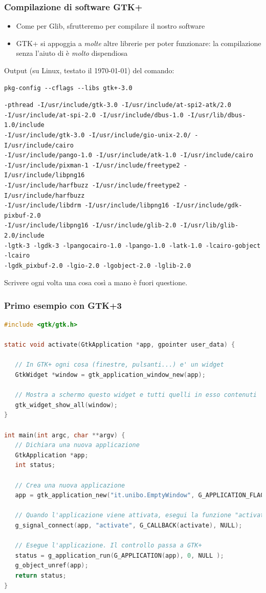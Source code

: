 \documentclass{beamer}
\begin{document}
\begin{frame}[fragile]
\frametitle{Compilazione di software GTK+}
\begin{itemize}
 \item Come per Glib, sfrutteremo \pkgconfig{} per compilare il nostro software
 \item GTK+ si appoggia a \textit{molte} altre librerie per poter funzionare: la compilazione senza l'aiuto di \pkgconfig{} è \textit{molto} dispendiosa
\end{itemize}
Output (su Linux, testato il \today{}) del comando:
\scriptsize
\begin{verbatim}
pkg-config --cflags --libs gtk+-3.0
\end{verbatim}
\scriptsize
\begin{verbatim}
-pthread -I/usr/include/gtk-3.0 -I/usr/include/at-spi2-atk/2.0
-I/usr/include/at-spi-2.0 -I/usr/include/dbus-1.0 -I/usr/lib/dbus-1.0/include
-I/usr/include/gtk-3.0 -I/usr/include/gio-unix-2.0/ -I/usr/include/cairo
-I/usr/include/pango-1.0 -I/usr/include/atk-1.0 -I/usr/include/cairo
-I/usr/include/pixman-1 -I/usr/include/freetype2 -I/usr/include/libpng16
-I/usr/include/harfbuzz -I/usr/include/freetype2 -I/usr/include/harfbuzz
-I/usr/include/libdrm -I/usr/include/libpng16 -I/usr/include/gdk-pixbuf-2.0
-I/usr/include/libpng16 -I/usr/include/glib-2.0 -I/usr/lib/glib-2.0/include
-lgtk-3 -lgdk-3 -lpangocairo-1.0 -lpango-1.0 -latk-1.0 -lcairo-gobject -lcairo
-lgdk_pixbuf-2.0 -lgio-2.0 -lgobject-2.0 -lglib-2.0
\end{verbatim}
\normalsize
Scrivere ogni volta una cosa così a mano è fuori questione.
\end{frame}


\begin{frame}[fragile]
\frametitle{Primo esempio con GTK+3}
\scriptsize
\begin{lstlisting}[language=C]
#include <gtk/gtk.h>

static void activate(GtkApplication *app, gpointer user_data) {

   // In GTK+ ogni cosa (finestre, pulsanti...) e' un widget 
   GtkWidget *window = gtk_application_window_new(app);

   // Mostra a schermo questo widget e tutti quelli in esso contenuti
   gtk_widget_show_all(window);
}

int main(int argc, char **argv) {
   // Dichiara una nuova applicazione
   GtkApplication *app;
   int status;

   // Crea una nuova applicazione
   app = gtk_application_new("it.unibo.EmptyWindow", G_APPLICATION_FLAGS_NONE);

   // Quando l'applicazione viene attivata, esegui la funzione "activate"
   g_signal_connect(app, "activate", G_CALLBACK(activate), NULL);
   
   // Esegue l'applicazione. Il controllo passa a GTK+
   status = g_application_run(G_APPLICATION(app), 0, NULL );
   g_object_unref(app);
   return status;
}
\end{lstlisting} 
\end{frame}
\end{document}
